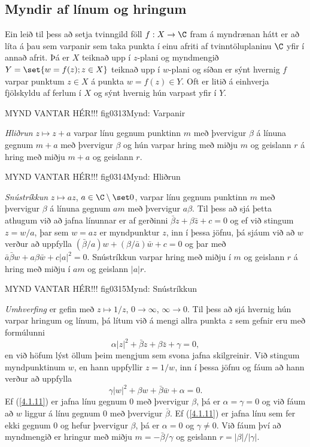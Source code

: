 \subsection*{Myndir af línum og hringum}

Ein  leið til þess að setja tvinngild föll
$f:X\to \C$ fram á myndrænan hátt
er að líta á þau sem varpanir sem taka punkta í einu afriti af
tvinntöluplaninu $\C$ yfir í annað afrit.  Þá er $X$ teiknað upp í
$z$-plani og myndmengið $Y=\set{w=f(z); z\in X}$ 
teiknað upp í $w$-plani og síðan er sýnt
hvernig $f$ varpar punktum $z\in X$ á punkta $w=f(z)\in Y$.
Oft er litið á einhverja fjölskyldu af ferlum í $X$ og sýnt hvernig hún
varpast yfir í $Y$. 


MYND VANTAR HÉR!!! {fig0313}{Mynd: Varpanir}


\smallskip\noindent
{\it Hliðrun}  $z\mapsto z+a$ varpar línu gegnum punktinn $m$ með
þvervigur ${\beta}$  á línuna gegnum $m+a$ með þvervigur ${\beta}$ og
hún varpar hring með miðju $m$ og geislann $r$ á hring með miðju $m+a$
og geislann $r$.



MYND VANTAR HÉR!!! {fig0314}{Mynd: Hliðrun}


\smallskip\noindent
{\it Snústríkkun}
$z\mapsto az$, $a\in \C\setminus \set 0$, varpar línu gegnum
punktinn $m$ með þvervigur ${\beta}$  á línuna gegnum $am$ með
þvervigur $a{\beta}$. Til þess að sjá þetta athugum við að jafna
línunnar er af gerðinni $\bar {\beta} z+{\beta}\bar z+c=0$ og ef við
stingum $z=w/a$, þar sem $w=az$ er myndpunktur $z$, inn í þessa
jöfnu, þá sjáum við að $w$ verður að uppfylla
$(\bar {\beta}/a) w+({\beta}/\bar a)\bar w+c=0$ og þar með
$\bar a\bar {\beta} w+a{\beta}\bar w+c|a|^2=0$.  
Snústríkkun varpar hring með miðju í $m$ og geislann $r$ á hring með
miðju í $am$ og geislann $|a|r$.


MYND VANTAR HÉR!!! {fig0315}{Mynd: Snústríkkun}


\smallskip\noindent
{\it Umhverfing} er gefin
með $z\mapsto 1/z$, $0\to {\infty}$, ${\infty}\to 0$.  Til þess að
sjá hvernig hún varpar hringum og línum, þá lítum við á mengi allra
punkta $z$ sem gefnir eru með formúlunni
\begin{equation}
{\alpha}|z|^2+\bar {\beta} z+{\beta}\bar z +{\gamma}=0,
\label{4.1.11}
\end{equation}
en við höfum lýst öllum þeim mengjum sem svona jafna skilgreinir.
Við stingum myndpunktinum  $w$, en hann uppfyllir $z=1/w$, inn 
í þessa jöfnu og fáum að hann verður að uppfylla
\begin{equation}
{\gamma}|w|^2+{\beta}w+\bar {\beta}\bar w +{\alpha}=0.
\label{4.1.12}
\end{equation}
Ef (\ref{4.1.11}) er jafna línu gegnum $0$ með þvervigur ${\beta}$, þá er
${\alpha}={\gamma}=0$ og við fáum að $w$ liggur á línu gegnum $0$ með
þvervigur $\bar {\beta}$.  Ef (\ref{4.1.11}) er jafna línu sem fer ekki gegnum
$0$ og hefur þvervigur ${\beta}$, þá er ${\alpha}=0$ og ${\gamma}\neq
0$.  Við fáum því að myndmengið er hringur með miðju $m=-\bar
{\beta}/{\gamma}$  og geislann $r=|{\beta}|/|{\gamma}|$.




